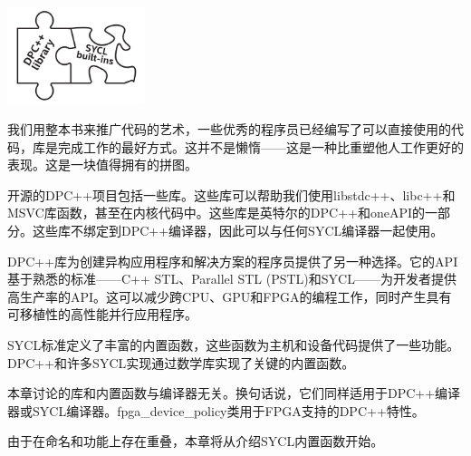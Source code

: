 \begin{center}
	\includegraphics[width=0.3\textwidth]{content/chapter-18/images/1}
\end{center}

我们用整本书来推广代码的艺术，一些优秀的程序员已经编写了可以直接使用的代码，库是完成工作的最好方式。这并不是懒惰——这是一种比重塑他人工作更好的表现。这是一块值得拥有的拼图。\par

开源的DPC++项目包括一些库。这些库可以帮助我们使用libstdc++、libc++和MSVC库函数，甚至在内核代码中。这些库是英特尔的DPC++和oneAPI的一部分。这些库不绑定到DPC++编译器，因此可以与任何SYCL编译器一起使用。\par

DPC++库为创建异构应用程序和解决方案的程序员提供了另一种选择。它的API基于熟悉的标准——C++ STL、Parallel STL (PSTL)和SYCL——为开发者提供高生产率的API。这可以减少跨CPU、GPU和FPGA的编程工作，同时产生具有可移植性的高性能并行应用程序。\par

SYCL标准定义了丰富的内置函数，这些函数为主机和设备代码提供了一些功能。DPC++和许多SYCL实现通过数学库实现了关键的内置函数。\par

本章讨论的库和内置函数与编译器无关。换句话说，它们同样适用于DPC++编译器或SYCL编译器。fpga\_device\_policy类用于FPGA支持的DPC++特性。\par

由于在命名和功能上存在重叠，本章将从介绍SYCL内置函数开始。\par



















